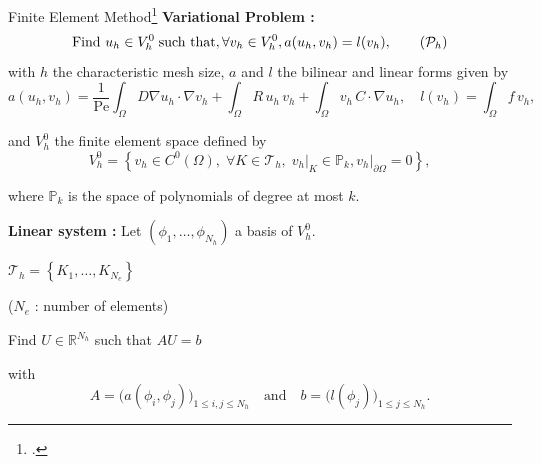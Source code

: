 \begin{frame}{Finite Element Method\footcite{Ern2004TheoryAP}}	
	\textbf{Variational Problem :} 
	\begin{equation}
		\label{eq:weakform}
		\text{Find } u_h\in V_h^0 \;\text{such that}, \forall v_h\in V_h^0, a(u_h,v_h)=l(v_h),
		\tag{$\mathcal{P}_h$}
	\end{equation}
	\vspace{1pt}
	with $h$ the characteristic mesh size, $a$ and $l$ the bilinear and linear forms given by
	\vspace{-3pt}
	\begin{equation*}
		a(u_h,v_h)=
		\frac{1}{\text{Pe}} \int_{\Omega}D \nabla u_h \cdot  \nabla v_h+
		\int_{\Omega} R \, u_h \, v_h  +
		\int_{\Omega} v_h \, C \cdot \nabla u_h, \quad l(v_h)=\int_{\Omega} f \, v_h,
	\end{equation*}

	\begin{minipage}[t]{0.7\linewidth}
		\vspace{-3pt}
		and $V_h^0$ the finite element space defined by
		\vspace{-3pt}
		\begin{equation*}
			V_h^0 = \left\{v_h\in C^0(\Omega),\; \forall K\in \mathcal{T}_h,\; v_h\vert_{K}\in\mathbb{P}_k,v_h\vert_{\partial\Omega}=0\right\},
		\end{equation*}

		\vspace{-3pt}
		where $\mathbb{P}_k$ is the space of polynomials of degree at most $k$.

		\vspace{10pt}
		\textbf{Linear system :} Let $(\phi_1,\dots,\phi_{N_h})$ a basis of $V_h^0$.
	\end{minipage} \qquad \begin{minipage}[t][][b]{0.2\linewidth}
		\centering
		
		\footnotesize
		$\mathcal{T}_h = \left\{K_1,\dots,K_{N_e}\right\}$
		
		\tiny
		($N_e$ : number of elements)
	\end{minipage}

	\vspace{-5pt}
	Find $U\in\mathbb{R}^{N_h}$ such that \hspace{40pt} $AU=b$

	with 
	\begin{equation*}
		A=\big(a(\phi_i,\phi_j)\big)_{1\le i,j\le N_h} \quad \text{and} \quad b=\big(l(\phi_j)\big)_{1\le j\le N_h}.
	\end{equation*}
	\vspace{-3pt}
\end{frame}